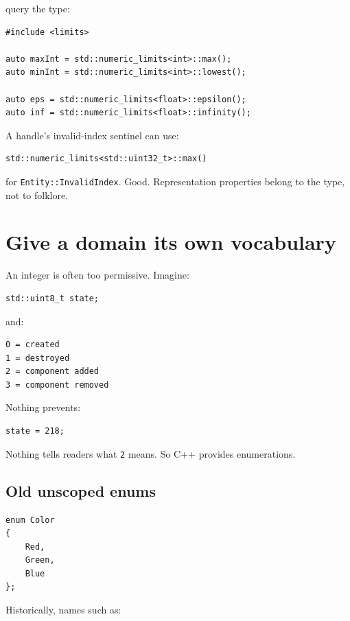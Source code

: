 query the type:

\begin{verbatim}
#include <limits>

auto maxInt = std::numeric_limits<int>::max();
auto minInt = std::numeric_limits<int>::lowest();

auto eps = std::numeric_limits<float>::epsilon();
auto inf = std::numeric_limits<float>::infinity();
\end{verbatim}

A handle's invalid-index sentinel can use:

\begin{verbatim}
std::numeric_limits<std::uint32_t>::max()
\end{verbatim}

for \texttt{Entity::InvalidIndex}. Good. Representation properties belong to the type, not to folklore.

\section{Give a domain its own vocabulary}\label{05-engine-i-ch002-give-a-domain-its-own-vocabulary}

An integer is often too permissive. Imagine:

\begin{verbatim}
std::uint8_t state;
\end{verbatim}

and:

\begin{verbatim}
0 = created
1 = destroyed
2 = component added
3 = component removed
\end{verbatim}

Nothing prevents:

\begin{verbatim}
state = 218;
\end{verbatim}

Nothing tells readers what \texttt{2} means. So C++ provides enumerations.

\subsection{Old unscoped enums}\label{05-engine-i-ch002-old-unscoped-enums}

\begin{verbatim}
enum Color
{
    Red,
    Green,
    Blue
};
\end{verbatim}

Historically, names such as:

